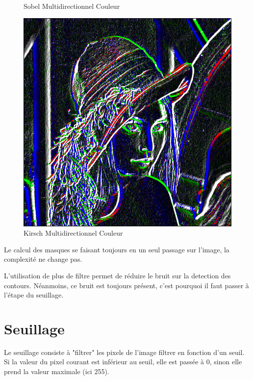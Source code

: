 \documentclass[11pt]{article}
\begin{document}
\begin{figure}[H]
\begin{minipage}[c]{.3\linewidth}
			\caption{Sobel Multidirectionnel Couleur}
			\label{fig:SobelMultidirectionnelCouleur}
		\end{minipage}\hfill
		\begin{minipage}[c]{.3\linewidth}
		\centering
		\includegraphics[scale=0.25]{Image/filtreMultidirectionnelKirschCouleur.png}
		\caption{Kirsch Multidirectionnel Couleur}
		\label{fig:KirschMultidirectionnelCouleur}
		\end{minipage}
	\end{figure}

	Le calcul des masques se faisant toujours en un seul passage sur l'image, la complexité ne change pas.

	L'utilisation de plus de filtre permet de réduire le bruit sur la detection des contours. 
	Néanmoins, ce bruit est toujours présent, c'est pourquoi il faut passer à l'étape du seuillage.
 
\section{Seuillage}
	
	Le seuillage consiste à "filtrer" les pixels de l'image filtrer en fonction d'un seuil. 
	Si la valeur du pixel courant est inférieur au seuil, elle est passée à 0, sinon elle prend la valeur maximale (ici 255).
\end{document}
